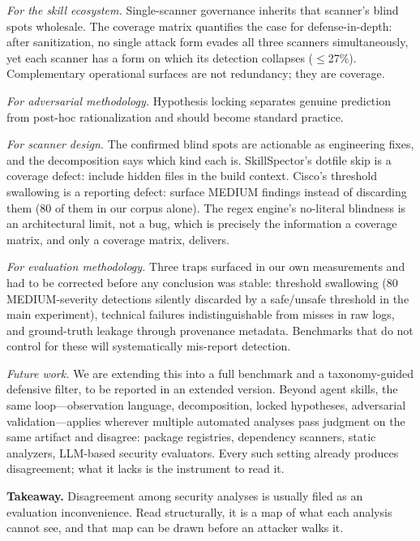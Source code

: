 \documentclass[sigconf,nonacm]{acmart}
\begin{document}
\emph{For the skill ecosystem.} Single-scanner governance inherits that scanner's blind spots wholesale. The coverage matrix quantifies the case for defense-in-depth: after sanitization, no single attack form evades all three scanners simultaneously, yet each scanner has a form on which its detection collapses ($\le$27\%). Complementary operational surfaces are not redundancy; they are coverage.

\emph{For adversarial methodology.} Hypothesis locking separates genuine prediction from post-hoc rationalization and should become standard practice.

\emph{For scanner design.} The confirmed blind spots are actionable as engineering fixes, and the decomposition says which kind each is. SkillSpector's dotfile skip is a coverage defect: include hidden files in the build context. Cisco's threshold swallowing is a reporting defect: surface MEDIUM findings instead of discarding them (80 of them in our corpus alone). The regex engine's no-literal blindness is an architectural limit, not a bug, which is precisely the information a coverage matrix, and only a coverage matrix, delivers.

\emph{For evaluation methodology.} Three traps surfaced in our own measurements and had to be corrected before any conclusion was stable: threshold swallowing (80 MEDIUM-severity detections silently discarded by a safe/unsafe threshold in the main experiment), technical failures indistinguishable from misses in raw logs, and ground-truth leakage through provenance metadata. Benchmarks that do not control for these will systematically mis-report detection.

\emph{Future work.} We are extending this into a full benchmark and a taxonomy-guided defensive filter, to be reported in an extended version. Beyond agent skills, the same loop---observation language, decomposition, locked hypotheses, adversarial validation---applies wherever multiple automated analyses pass judgment on the same artifact and disagree: package registries, dependency scanners, static analyzers, LLM-based security evaluators. Every such setting already produces disagreement; what it lacks is the instrument to read it.

\medskip
\noindent\textbf{Takeaway.} Disagreement among security analyses is usually filed as an evaluation inconvenience. Read structurally, it is a map of what each analysis cannot see, and that map can be drawn before an attacker walks it.

\end{document}
